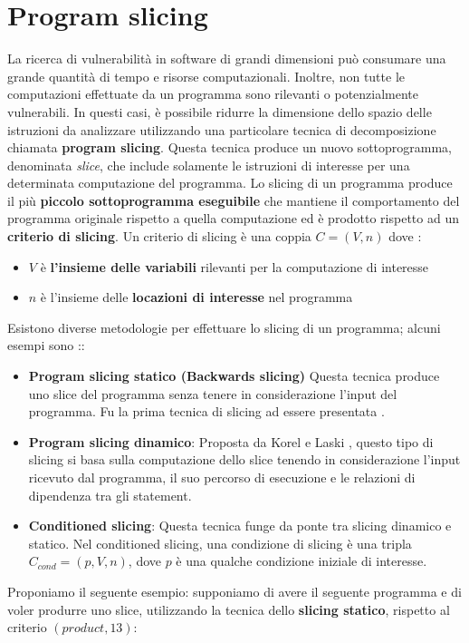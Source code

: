 \documentclass[../main.tex]{subfiles}
\begin{document}
\section{Program slicing}
La ricerca di vulnerabilità in software di grandi dimensioni può consumare una grande quantità di tempo e risorse computazionali.
Inoltre, non tutte le computazioni effettuate da un programma sono rilevanti o potenzialmente vulnerabili. 
In questi casi, è possibile ridurre la dimensione dello spazio delle istruzioni da analizzare utilizzando una particolare tecnica di decomposizione
chiamata \textbf{program slicing}.
Questa tecnica produce un nuovo sottoprogramma, denominata \textit{slice}, che include solamente le istruzioni di interesse per una determinata computazione del programma.
Lo slicing di un programma produce il più \textbf{piccolo sottoprogramma eseguibile} che mantiene il comportamento del programma originale rispetto a quella computazione ed è prodotto rispetto ad un \textbf{criterio di slicing}.
Un criterio di slicing è una coppia $C = (V, n)$ dove \cite{Sclicing}:
\begin{itemize}
    \item $V$ è \textbf{l'insieme delle variabili} rilevanti per la computazione di interesse
    \item $n$ è l'insieme delle \textbf{locazioni di interesse} nel programma 
\end{itemize}
Esistono diverse metodologie per effettuare lo slicing di un programma; alcuni esempi sono \cite{Sclicing}::
\begin{itemize}
    \item \textbf{Program slicing statico (Backwards slicing)} Questa tecnica produce uno slice del programma senza tenere in considerazione l'input del programma. Fu la prima tecnica di slicing ad essere presentata \cite{weiser1981program}.
    \item \textbf{Program slicing dinamico}: Proposta da Korel e Laski \cite{korel1988dynamic}, questo tipo di slicing si basa sulla computazione dello slice tenendo in considerazione l'input ricevuto dal programma, il suo percorso di esecuzione e le relazioni di dipendenza tra gli statement.
    \item \textbf{Conditioned slicing}: Questa tecnica funge da ponte tra slicing dinamico e statico. Nel conditioned slicing, una condizione di slicing è una tripla $C_{cond} = (p, V, n)$, dove $p$ è una qualche condizione iniziale di interesse.
\end{itemize}
\newpage \noindent
Proponiamo il seguente esempio: supponiamo di avere il seguente programma e di voler produrre uno slice, utilizzando la tecnica dello \textbf{slicing statico}, rispetto al criterio $(product, 13)$:


\end{document}

